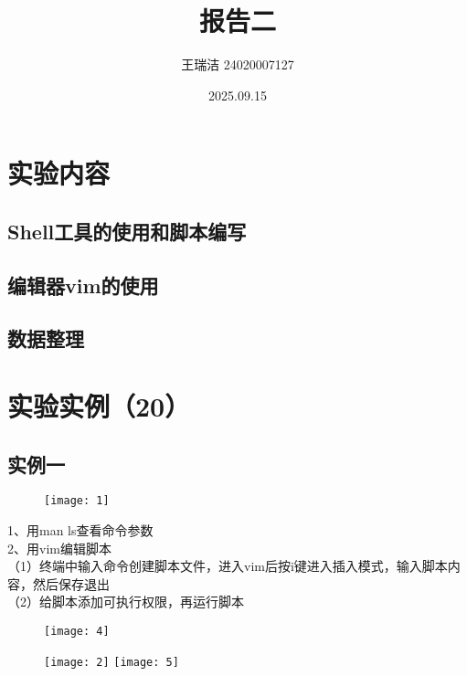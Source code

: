 \documentclass[12pt,letterpaper]{article}
\title{报告二}
\author{王瑞洁 24020007127}
\date{2025.09.15}
\begin{document}
\maketitle
\section{实验内容}
\subsection{Shell工具的使用和脚本编写}
\subsection{编辑器vim的使用}
\subsection{数据整理}
\vspace{1em}  %

\section{实验实例（20）}

\subsection{实例一}
\begin{figure}[h]
\centering
\texttt{[image: 1]}
\end{figure}
1、用man ls查看命令参数\\
2、用vim编辑脚本\\
（1）终端中输入命令创建脚本文件，进入vim后按i键进入插入模式，输入脚本内容，然后保存退出\\
（2）给脚本添加可执行权限，再运行脚本
\begin{figure}[H]
\centering
\texttt{[image: 4]}
\end{figure}
\vspace{-6mm}
\begin{figure}[H]
\centering
\texttt{[image: 2]}
\texttt{[image: 5]}
\end{figure}
\end{document}
